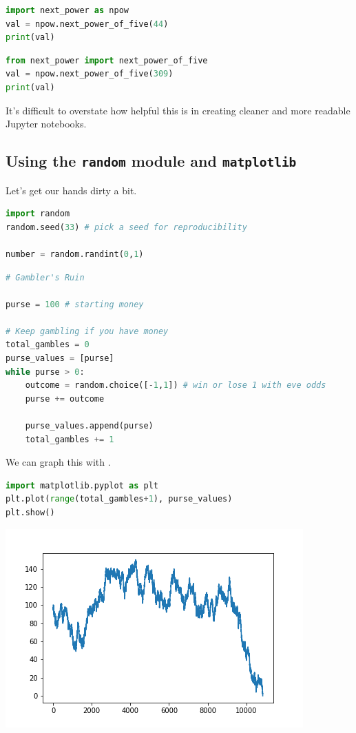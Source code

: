 \begin{lstlisting}[language = Python]
import next_power as npow
val = npow.next_power_of_five(44)
print(val)
\end{lstlisting}

\begin{lstlisting}[language = Python]
from next_power import next_power_of_five
val = npow.next_power_of_five(309)
print(val)
\end{lstlisting}

\noindent It's difficult to overstate how helpful this is in creating cleaner and more readable Jupyter notebooks. 


\subsection{Using the \texttt{random} module and \texttt{matplotlib}}

Let's get our hands dirty a bit. 

\begin{lstlisting}[language = Python]
import random
random.seed(33) # pick a seed for reproducibility

number = random.randint(0,1)
\end{lstlisting}


\begin{lstlisting}[language = Python]
# Gambler's Ruin

purse = 100 # starting money

# Keep gambling if you have money
total_gambles = 0
purse_values = [purse]
while purse > 0:
    outcome = random.choice([-1,1]) # win or lose 1 with eve odds
    purse += outcome 
    
    purse_values.append(purse) 
    total_gambles += 1 
\end{lstlisting}

\noindent We can graph this with .

\begin{lstlisting}[language = Python]
import matplotlib.pyplot as plt
plt.plot(range(total_gambles+1), purse_values)
plt.show()
\end{lstlisting}

\begin{center}
    \includegraphics[width = .5\textwidth]{gamblers_ruin.png}
\end{center}